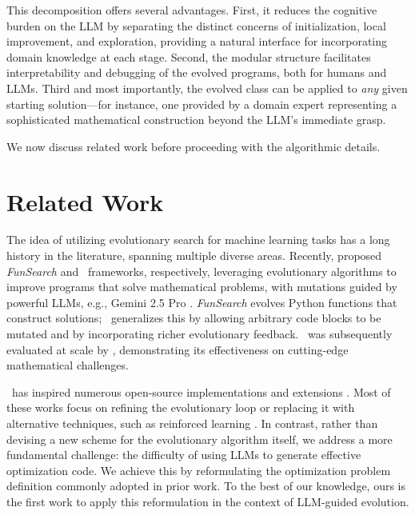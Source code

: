 \documentclass[sigconf]{acmart}
\begin{document}
This decomposition offers several advantages. First, it reduces the cognitive burden on the LLM by separating the distinct concerns of initialization, local improvement, and exploration, providing a natural interface for incorporating domain knowledge at each stage. Second, the modular structure facilitates interpretability and debugging of the evolved programs, both for humans and LLMs. Third and most importantly, the evolved class can be applied to \emph{any} given starting solution---for instance, one provided by a domain expert representing a sophisticated mathematical construction beyond the LLM's immediate grasp.

We now discuss related work before proceeding with the algorithmic details.

\section{Related Work}\label{sec:related}

The idea of utilizing evolutionary search for machine learning tasks has a long history in the literature, spanning multiple diverse areas. Recently, \citet{romera2024mathematical, novikov2025alphaevolve} proposed \emph{FunSearch} and \alphaevolve\ frameworks, respectively, leveraging evolutionary algorithms to improve programs that solve mathematical problems, with mutations guided by powerful LLMs, e.g., Gemini 2.5 Pro \cite{comanici2025gemini}. \emph{FunSearch} evolves Python functions that construct solutions; \alphaevolve\ generalizes this by allowing arbitrary code blocks to be mutated and by incorporating richer evolutionary feedback. \alphaevolve\ was subsequently evaluated at scale by \citet{georgiev2025mathematical}, demonstrating its effectiveness on cutting-edge mathematical challenges.

\alphaevolve\ has inspired numerous open-source implementations and extensions \citep{openevolve,lange2025shinkaevolve, khrulkov2025gigaevo, assumpção2026codeevolveopensourceevolutionary, wang2025thetaevolve, yan2026pacevolve, yuksekgonul2026learning}. Most of these works focus on refining the evolutionary loop or replacing it with alternative techniques, such as reinforced learning \citep{wang2025thetaevolve, yuksekgonul2026learning}. In contrast, rather than devising a new scheme for the evolutionary algorithm itself, we address a more fundamental challenge: the difficulty of using LLMs to generate effective optimization code. We achieve this by reformulating the optimization problem definition commonly adopted in prior work. To the best of our knowledge, ours is the first work to apply this reformulation in the context of LLM-guided evolution.
\end{document}
